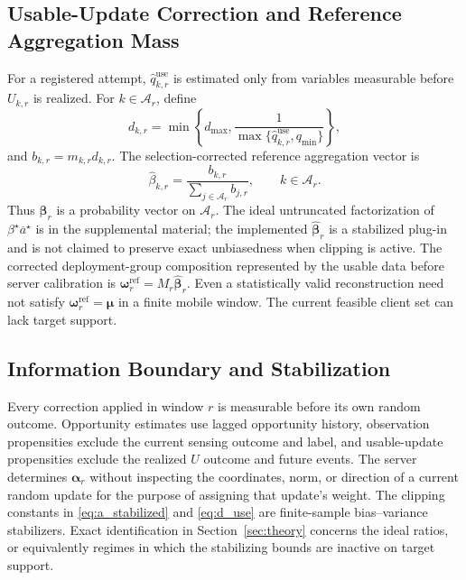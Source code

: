 \documentclass[letterpaper,journal]{IEEEtran}
\begin{document}
\subsection{Usable-Update Correction and Reference Aggregation Mass}
\label{subsec:usable_correction}

For a registered attempt, $\widehat q^{\mathrm{use}}_{k,r}$ is estimated only
from variables measurable before $U_{k,r}$ is realized.  For
$k\in\mathcal{A}_r$, define
\begin{equation}
 d_{k,r}
 =
 \min\!\left\{
 d_{\max},
 \frac{1}
 {\max\{\widehat q^{\mathrm{use}}_{k,r},q_{\min}\}}
 \right\},
 \label{eq:d_use}
\end{equation}
and $b_{k,r}=m_{k,r}d_{k,r}$.
The selection-corrected reference aggregation vector is
\begin{equation}
 \widehat\beta_{k,r}
 =
 \frac{b_{k,r}}
 {\sum_{j\in\mathcal{A}_r}b_{j,r}},
 \qquad
 k\in\mathcal{A}_r.
 \label{eq:beta_ref}
\end{equation}
Thus $\widehat{\boldsymbol\beta}_r$ is a probability vector on
$\mathcal{A}_r$.  The ideal untruncated factorization of
$\beta^\star\overline a^\star$ is in the supplemental material; the
implemented $\widehat{\boldsymbol\beta}_r$ is a stabilized plug-in and is
not claimed to preserve exact unbiasedness when clipping is active.
The corrected deployment-group composition represented by the usable
data before server calibration is
$\boldsymbol\omega_r^{\mathrm{ref}}=M_r\widehat{\boldsymbol\beta}_r$.
Even a statistically valid reconstruction need not satisfy
$\boldsymbol\omega_r^{\mathrm{ref}}=\boldsymbol\mu$ in a finite mobile
window.  The current feasible client set can lack target support.

\subsection{Information Boundary and Stabilization}
\label{subsec:information_boundary}

Every correction applied in window $r$ is measurable before its own random
outcome.  Opportunity estimates use lagged opportunity history,
observation propensities exclude the current sensing outcome and label,
and usable-update propensities exclude the realized $U$ outcome and
future events.  The server determines $\boldsymbol\alpha_r$ without
inspecting the coordinates, norm, or direction of a current random
update for the purpose of assigning that update's weight.  The clipping
constants in \eqref{eq:a_stabilized} and \eqref{eq:d_use} are
finite-sample bias--variance stabilizers.  Exact identification in
Section~\ref{sec:theory} concerns the ideal ratios, or equivalently
regimes in which the stabilizing bounds are inactive on target support.
\end{document}
